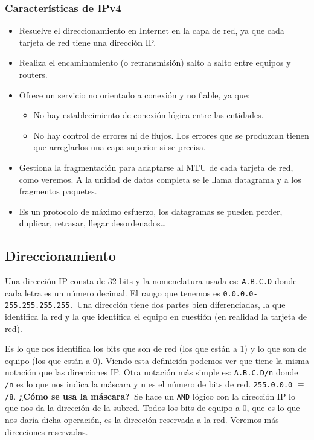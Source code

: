 \subsubsection{Características de \acrshort{IPv4}}
\begin{itemize}
    \item Resuelve el direccionamiento en Internet en la capa de red, ya que cada tarjeta de red tiene una dirección IP\@.
    \item Realiza el encaminamiento (o retransmisión) salto a salto entre equipos y routers.
    \item Ofrece un servicio no orientado a conexión y no fiable, ya que:
    \begin{itemize}
        \item No hay establecimiento de conexión lógica entre las entidades.
        \item No hay control de errores ni de flujos. Los errores que se produzcan tienen que arreglarlos una capa superior si se precisa.
    \end{itemize}
    \item Gestiona la fragmentación para adaptarse al \acrshort{MTU} de cada tarjeta de red, como veremos. A la unidad de datos completa se le llama datagrama y a los fragmentos paquetes. 
    \item Es un protocolo de máximo esfuerzo, los datagramas se pueden perder, duplicar, retrasar, llegar desordenados\ldots
\end{itemize}

\subsection{Direccionamiento}

Una dirección IP consta de 32 bits y la nomenclatura usada es: \verb|A.B.C.D| donde cada letra es un número decimal. El rango que tenemos es \verb|0.0.0.0-255.255.255.255.| Una dirección tiene dos partes bien diferenciadas, la que identifica la red y la que identifica el equipo en cuestión (en realidad la tarjeta de red). \

\begin{definicion}
    Es lo que nos identifica los bits que son de red (los que están a 1) y lo que son de equipo (los que están a 0). Viendo esta definición podemos ver que tiene la misma notación que las direcciones IP\@. Otra notación más simple es: \verb|A.B.C.D/n| donde \verb|/n| es lo que nos indica la máscara y n es el número de bits de red. \verb|255.0.0.0| $\equiv$ \verb|/8|.
\textbf{¿Cómo se usa la máscara?}\
Se hace un \verb|AND| lógico con la dirección IP lo que nos da la dirección de la subred. Todos los bits de equipo a 0, que es lo que nos daría dicha operación, es la dirección reservada a la red. Veremos más direcciones reservadas. \
\end{definicion}

